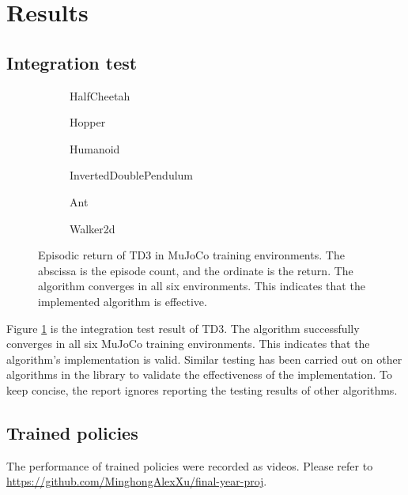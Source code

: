 \newpage
\section{Results} \label{sec:results}

\subsection{Integration test}

\begin{figure}[htbp]
\centering
\begin{subfigure}[b]{0.49\textwidth}
   \centering
   
   \caption{HalfCheetah}
\end{subfigure}
\begin{subfigure}[b]{0.49\textwidth}
   \centering
   
   \caption{Hopper}
\end{subfigure}
\begin{subfigure}[b]{0.49\textwidth}
   \centering
   
   \caption{Humanoid}
\end{subfigure}
\begin{subfigure}[b]{0.49\textwidth}
   \centering
   
   \caption{InvertedDoublePendulum}
\end{subfigure}
\begin{subfigure}[b]{0.49\textwidth}
   \centering
   
   \caption{Ant}
\end{subfigure}
\begin{subfigure}[b]{0.49\textwidth}
   \centering
   
   \caption{Walker2d}
\end{subfigure}
\caption{Episodic return of TD3 in MuJoCo training environments. The abscissa is the episode count, and the ordinate is the return. The algorithm converges in all six environments. This indicates that the implemented algorithm is effective.}
\label{fig:td3_test}
\end{figure}

Figure \ref{fig:td3_test} is the integration test result of TD3. The algorithm successfully converges in all six MuJoCo training environments. This indicates that the algorithm's implementation is valid. Similar testing has been carried out on other algorithms in the library to validate the effectiveness of the implementation. To keep concise, the report ignores reporting the testing results of other algorithms.

\subsection{Trained policies}

The performance of trained policies were recorded as videos. Please refer to \url{https://github.com/MinghongAlexXu/final-year-proj}.
